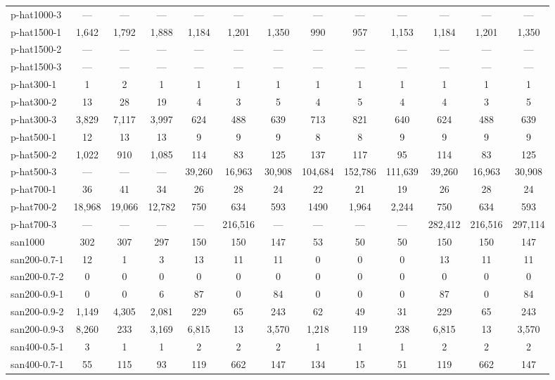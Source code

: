 \documentclass{l4proj}
\begin{document}
\begin{table}
\begin{center}
\begin{tiny}
\begin{tabular}{|l|c c c|c c c|c c c|c c c|}
p-hat1000-3 & --- & --- & --- & --- & --- & --- & --- & --- & --- & --- & --- & --- \\ 
p-hat1500-1 & 1,642 & 1,792 & 1,888 & 1,184 & 1,201 & 1,350 & 990 & 957 & 1,153 & 1,184 & 1,201 & 1,350 \\ 
p-hat1500-2 & --- & --- & --- & --- & --- & --- & --- & --- & --- & --- & --- & --- \\ 
p-hat1500-3 & --- & --- & --- & --- & --- & --- & --- & --- & --- & --- & --- & --- \\ 
p-hat300-1 & 1 & 2 & 1 & 1 & 1 & 1 & 1 & 1 & 1 & 1 & 1 & 1 \\ 
p-hat300-2 & 13 & 28 & 19 & 4 & 3 & 5 & 4 & 5 & 4 & 4 & 3 & 5 \\ 
p-hat300-3 & 3,829 & 7,117 & 3,997 & 624 & 488 & 639 & 713 & 821 & 640 & 624 & 488 & 639 \\ 
p-hat500-1 & 12 & 13 & 13 & 9 & 9 & 9 & 8 & 8 & 9 & 9 & 9 & 9 \\ 
p-hat500-2 & 1,022 & 910 & 1,085 & 114 & 83 & 125 & 137 & 117 & 95 & 114 & 83 & 125 \\ 
p-hat500-3 & --- & --- & --- & 39,260 & 16,963 & 30,908 & 104,684 & 152,786 & 111,639 & 39,260 & 16,963 & 30,908 \\ 
p-hat700-1 & 36 & 41 & 34 & 26 & 28 & 24 & 22 & 21 & 19 & 26 & 28 & 24 \\ 
p-hat700-2 & 18,968 & 19,066 & 12,782 & 750 & 634 & 593 & 1490 & 1,964 & 2,244 & 750 & 634 & 593 \\ 
p-hat700-3 & --- & --- & --- & --- & 216,516 & ---  & --- & --- & --- & 282,412 & 216,516 & 297,114 \\ 
san1000 & 302 & 307 & 297 & 150 & 150 & 147 & 53 & 50 & 50 & 150 & 150 & 147 \\ 
san200-0.7-1 & 12 & 1 & 3 & 13 & 11 & 11 & 0 & 0 & 0 & 13 & 11 & 11 \\ 
san200-0.7-2 & 0 & 0 & 0 & 0 & 0 & 0 & 0 & 0 & 0 & 0 & 0 & 0 \\ 
san200-0.9-1 & 0 & 0 & 6 & 87 & 0 & 84 & 0 & 0 & 0 & 87 & 0 & 84 \\ 
san200-0.9-2 & 1,149 & 4,305 & 2,081 & 229 & 65 & 243 & 62 & 49 & 31 & 229 & 65 & 243 \\ 
san200-0.9-3 & 8,260 & 233 & 3,169 & 6,815 & 13 & 3,570 & 1,218 & 119 & 238 & 6,815 & 13 & 3,570 \\ 
san400-0.5-1 & 3 & 1 & 1 & 2 & 2 & 2 & 1 & 1 & 1 & 2 & 2 & 2 \\ 
san400-0.7-1 & 55 & 115 & 93 & 119 & 662 & 147 & 134 & 15 & 51 & 119 & 662 & 147 \\ 

\end{tabular}
\end{tiny}
\end{center}
\end{table}
\end{document}
